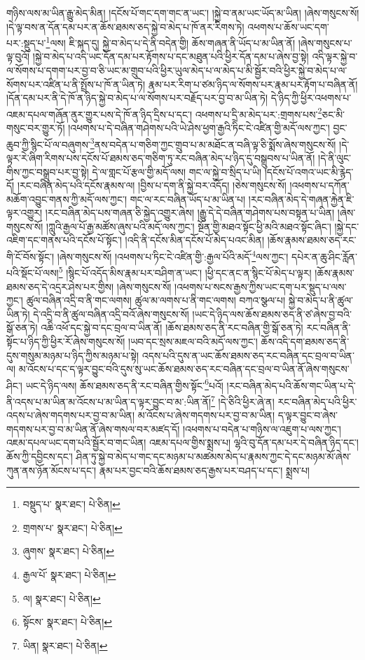 གཉིས་ལས་མ་ཡིན་རྒྱུ་མེད་མིན། །དངོས་པོ་གང་དག་གང་ན་ཡང་། །སྐྱེ་བ་ནམ་ཡང་ཡོད་མ་ཡིན། །ཞེས་གསུངས་སོ། །དེ་ལྟ་བས་ན་དོན་དམ་པར་ན་ཆོས་ཐམས་ཅད་སྐྱེ་བ་མེད་པ་ཁོ་ནར་རིགས་ཏེ། འཕགས་པ་ཆོས་ཡང་དག་པར་:སྡུད་པ་\footnote{བསྡུད་པ་  སྣར་ཐང་།  པེ་ཅིན། }ལས། ཇི་སྐད་དུ། སྐྱེ་བ་མེད་པ་དེ་ནི་བདེན་གྱི། ཆོས་གཞན་ནི་ཡོད་པ་མ་ཡིན་ནོ། །ཞེས་གསུངས་པ་ལྟ་བུའོ། །སྐྱེ་བ་མེད་པ་འདི་ཡང་དོན་དམ་པར་རྟོགས་པ་དང་མཐུན་པའི་ཕྱིར་དོན་དམ་པ་ཞེས་བྱ་སྟེ། འདི་ལྟར་སྐྱེ་བ་ལ་སོགས་པ་དགག་པར་བྱ་བ་ཅི་ཡང་མ་གྲུབ་པའི་ཕྱིར་ཡུལ་མེད་པ་ལ་མེད་པ་མི་སྦྱོར་བའི་ཕྱིར་སྐྱེ་བ་མེད་པ་ལ་སོགས་པར་འཛིན་པ་ནི་སྤྲོས་པ་ཁོ་ན་ཡིན་ཏེ། རྣམ་པར་རིག་པ་ཙམ་ཉིད་ལ་སོགས་པར་རྣམ་པར་རྟོག་པ་བཞིན་ནོ། །དོན་དམ་པར་ནི་དེ་ཁོ་ན་ཉིད་སྐྱེ་བ་མེད་པ་ལ་སོགས་པར་བརྗོད་པར་བྱ་བ་མ་ཡིན་ཏེ། དེ་ཉིད་ཀྱི་ཕྱིར་འཕགས་པ་འཇམ་དཔལ་གཞོན་ནུར་གྱུར་པས་དེ་ཁོ་ན་ཉིད་དྲིས་པ་དང་། འཕགས་པ་དྲི་མ་མེད་པར་:གྲགས་པས་\footnote{གྲགས་པ་  སྣར་ཐང་།  པེ་ཅིན། }ཅང་མི་གསུང་བར་གྱུར་ཏོ། །འཕགས་པ་དེ་བཞིན་གཤེགས་པའི་ཡེ་ཤེས་ཕྱག་རྒྱའི་ཏིང་ངེ་འཛིན་གྱི་མདོ་ལས་ཀྱང་། བྱང་ཆུབ་ཀྱི་སྙིང་པོ་ལ་བཞུགས་\footnote{ཞུགས་  སྣར་ཐང་།  པེ་ཅིན། }ནས་བདེན་པ་གཅིག་ཀྱང་གྲུབ་པ་མ་མཐོང་ན་བཞི་ལྟ་ཅི་སྨོས་ཞེས་གསུངས་སོ། །དེ་ལྟར་རེ་ཞིག་རིགས་པས་དངོས་པོ་ཐམས་ཅད་གཅིག་ཏུ་རང་བཞིན་མེད་པ་ཉིད་དུ་བསྒྲུབས་པ་ཡིན་ནོ། །དེ་ནི་ལུང་གིས་ཀྱང་བསྒྲུབ་པར་བྱ་སྟེ། དེ་ལ་གླང་པོ་རྩལ་གྱི་མདོ་ལས། གང་ལ་སྐྱེ་བ་སྲིད་པ་ཡི། །དངོས་པོ་འགའ་ཡང་མི་རྙེད་དོ། །རང་བཞིན་མེད་པའི་དངོས་རྣམས་ལ། །བྱིས་པ་དག་ནི་སྐྱེ་བར་འདོད། །ཅེས་གསུངས་སོ། །འཕགས་པ་དཀོན་མཆོག་འབྱུང་གནས་ཀྱི་མདོ་ལས་ཀྱང་། གང་ལ་རང་བཞིན་ཡོད་པ་མ་ཡིན་པ། །རང་བཞིན་མེད་དེ་གཞན་རྐྱེན་ཇི་ལྟར་འགྱུར། །རང་བཞིན་མེད་པས་གཞན་ཅི་སྐྱེད་འགྱུར་ཞེས། །རྒྱུ་དེ་དེ་བཞིན་གཤེགས་པས་བསྟན་པ་ཡིན། །ཞེས་གསུངས་སོ། །ཀླུའི་རྒྱལ་པོ་རྒྱ་མཚོས་ཞུས་པའི་མདོ་ལས་ཀྱང་། སྔོན་གྱི་མཐའ་སྟོང་ཕྱི་མའི་མཐའ་སྟོང་ཞིང་། །སྐྱེ་དང་འཇིག་དང་གནས་པའི་དངོས་པོ་སྟོང་། །འདི་ནི་དངོས་མིན་དངོས་པོ་མེད་པའང་མིན། །ཆོས་རྣམས་ཐམས་ཅད་རང་གི་ངོ་བོས་སྟོང་། །ཞེས་གསུངས་སོ། །འཕགས་པ་ཏིང་ངེ་འཛིན་གྱི་:རྒྱལ་པོའི་མདོ་\footnote{རྒྱལ་པོ་  སྣར་ཐང་།  པེ་ཅིན། }ལས་ཀྱང་། དཔེར་ན་ཆུ་ཤིང་རློན་པའི་སྡོང་པོ་ལས།\footnote{ལ།  སྣར་ཐང་།  པེ་ཅིན། } །སྙིང་པོ་འདོད་མིས་རྣམ་པར་བཤིག་ན་ཡང་། །ཕྱི་དང་ནང་ན་སྙིང་པོ་མེད་པ་ལྟར། །ཆོས་རྣམས་ཐམས་ཅད་དེ་འདྲར་ཤེས་པར་གྱིས། །ཞེས་གསུངས་སོ། །འཕགས་པ་སངས་རྒྱས་ཀྱིས་ཡང་དག་པར་སྡུད་པ་ལས་ཀྱང་། ཚུལ་བཞིན་འདྲི་བ་ནི་གང་ལགས། ཚུལ་མ་ལགས་པ་ནི་གང་ལགས། བཀའ་སྩལ་པ། སྐྱེ་བ་མེད་པ་ནི་ཚུལ་ཡིན་ཏེ། དེ་འདྲི་བ་ནི་ཚུལ་བཞིན་འདྲི་བའོ་ཞེས་གསུངས་སོ། །ཡང་དེ་ཉིད་ལས་ཆོས་ཐམས་ཅད་ནི་ཙ་ཞེས་བྱ་བའི་སྒོ་ཅན་ཏེ། འཆི་འཕོ་དང་སྐྱེ་བ་དང་བྲལ་བ་ཡིན་ནོ། །ཆོས་ཐམས་ཅད་ནི་རང་བཞིན་གྱི་སྒོ་ཅན་ཏེ། རང་བཞིན་ནི་སྟོང་པ་ཉིད་ཀྱི་ཕྱིར་རོ་ཞེས་གསུངས་སོ། །ཡབ་དང་སྲས་མཇལ་བའི་མདོ་ལས་ཀྱང་། ཆོས་འདི་དག་ཐམས་ཅད་ནི་དུས་གསུམ་མཉམ་པ་ཉིད་ཀྱིས་མཉམ་པ་སྟེ། འདས་པའི་དུས་ན་ཡང་ཆོས་ཐམས་ཅད་རང་བཞིན་དང་བྲལ་བ་ཡིན་ལ། མ་འོངས་པ་དང་ད་ལྟར་བྱུང་བའི་དུས་སུ་ཡང་ཆོས་ཐམས་ཅད་རང་བཞིན་དང་བྲལ་བ་ཡིན་ནོ་ཞེས་གསུངས་ཤིང་། ཡང་དེ་ཉིད་ལས། ཆོས་ཐམས་ཅད་ནི་རང་བཞིན་གྱིས་སྟོང་\footnote{སྟོངས་  སྣར་ཐང་།  པེ་ཅིན། }པའོ། །རང་བཞིན་མེད་པའི་ཆོས་གང་ཡིན་པ་དེ་ནི་འདས་པ་མ་ཡིན་མ་འོངས་པ་མ་ཡིན་ད་ལྟར་བྱུང་བ་མ་:ཡིན་ནོ།\footnote{ཡིན།  སྣར་ཐང་།  པེ་ཅིན། } །དེ་ཅིའི་ཕྱིར་ཞེ་ན། རང་བཞིན་མེད་པའི་ཕྱིར་འདས་པ་ཞེས་གདགས་པར་བྱ་བ་མ་ཡིན། མ་འོངས་པ་ཞེས་གདགས་པར་བྱ་བ་མ་ཡིན། ད་ལྟར་བྱུང་བ་ཞེས་གདགས་པར་བྱ་བ་མ་ཡིན་ནོ་ཞེས་གསལ་བར་མཛད་དོ། །འཕགས་པ་བདེན་པ་གཉིས་ལ་འཇུག་པ་ལས་ཀྱང་། འཇམ་དཔལ་ཡང་དག་པའི་སྦྱོར་བ་གང་ཡིན། འཇམ་དཔལ་གྱིས་སྨྲས་པ། ལྷའི་བུ་དོན་དམ་པར་དེ་བཞིན་ཉིད་དང་། ཆོས་ཀྱི་དབྱིངས་དང་། ཤིན་ཏུ་སྐྱེ་བ་མེད་པ་གང་དང་མཉམ་པ་མཚམས་མེད་པ་རྣམས་ཀྱང་དེ་དང་མཉམ་མོ་ཞེས་ཀུན་ནས་ཉོན་མོངས་པ་དང་། རྣམ་པར་བྱང་བའི་ཆོས་ཐམས་ཅད་རྒྱས་པར་བཤད་པ་དང་། སྨྲས་པ། 